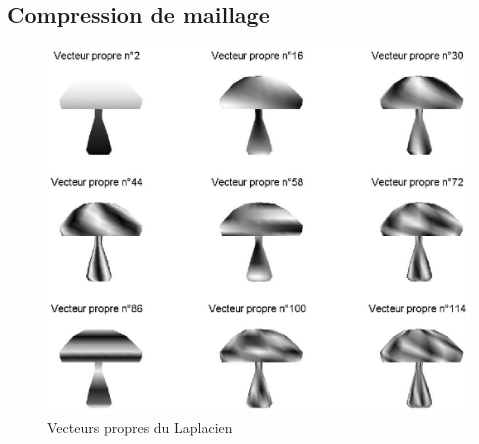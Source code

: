 \subsection{Compression de maillage}
\label{sect2-compression-maillage} 

\begin{figure}[ht] 
    \begin{center}
    \includegraphics[scale=0.6]{images/graph-compression-eigenvectors.ps}
    \end{center}
    \caption{Vecteurs propres du Laplacien}
	 \label{fig-graph-compression-eigenvectors}
\end{figure}
